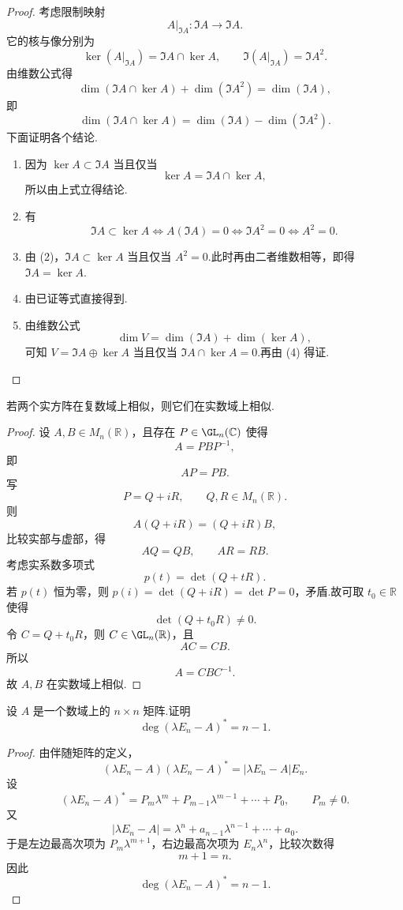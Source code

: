 \begin{proof}
	考虑限制映射
	\[
	A|_{\Im A}:\Im A\longrightarrow \Im A.
	\]
	它的核与像分别为
	\[
	\ker(A|_{\Im A})=\Im A\cap\ker A,
	\qquad
	\Im(A|_{\Im A})=\Im A^2.
	\]
	由维数公式得
	\[
	\dim(\Im A\cap\ker A)+\dim(\Im A^2)=\dim(\Im A),
	\]
	即
	\[
	\dim(\Im A\cap\ker A)=\dim(\Im A)-\dim(\Im A^2).
	\]
	下面证明各个结论.
	\begin{enumerate}
		\item 因为 $\ker A\subset \Im A$ 当且仅当
		\[
		\ker A=\Im A\cap\ker A,
		\]
		所以由上式立得结论.
		\item 有
		\[
		\Im A\subset \ker A
		\Longleftrightarrow
		A(\Im A)=0
		\Longleftrightarrow
		\Im A^2=0
		\Longleftrightarrow A^2=0.
		\]
		\item 由 (2)，$\Im A\subset\ker A$ 当且仅当 $A^2=0$.此时再由二者维数相等，即得
		$\Im A=\ker A$.
		\item 由已证等式直接得到.
		\item 由维数公式
		\[
		\dim V=\dim(\Im A)+\dim(\ker A),
		\]
		可知 $V=\Im A\oplus\ker A$ 当且仅当
		$\Im A\cap\ker A=0$.再由 (4) 得证.
	\end{enumerate}
\end{proof}

\begin{problem}[12]
	若两个实方阵在复数域上相似，则它们在实数域上相似.
\end{problem}

\begin{proof}
	设 $A,B\in M_n(\mathbb{R})$，且存在 $P\in \GL_n(\mathbb{C})$ 使得
	\[
	A=PBP^{-1},
	\]
	即
	\[
	AP=PB.
	\]
	写
	\[
	P=Q+iR,
	\qquad Q,R\in M_n(\mathbb{R}).
	\]
	则
	\[
	A(Q+iR)=(Q+iR)B,
	\]
	比较实部与虚部，得
	\[
	AQ=QB,
	\qquad
	AR=RB.
	\]
	考虑实系数多项式
	\[
	p(t)=\det(Q+tR).
	\]
	若 $p(t)$ 恒为零，则 $p(i)=\det(Q+iR)=\det P=0$，矛盾.故可取 $t_0\in\mathbb{R}$ 使得
	\[
	\det(Q+t_0R)\neq0.
	\]
	令 $C=Q+t_0R$，则 $C\in \GL_n(\mathbb{R})$，且
	\[
	AC=CB.
	\]
	所以
	\[
	A=CBC^{-1}.
	\]
	故 $A,B$ 在实数域上相似.
\end{proof}

\begin{problem}[15]
	设 $A$ 是一个数域上的 $n\times n$ 矩阵.证明
	\[
	\deg(\lambda E_n-A)^*=n-1.
	\]
\end{problem}

\begin{proof}
	由伴随矩阵的定义，
	\[
	(\lambda E_n-A)(\lambda E_n-A)^*=|\lambda E_n-A|E_n.
	\]
	设
	\[
	(\lambda E_n-A)^*=P_m\lambda^m+P_{m-1}\lambda^{m-1}+\cdots+P_0,
	\qquad P_m\neq0.
	\]
	又
	\[
	|\lambda E_n-A|=\lambda^n+a_{n-1}\lambda^{n-1}+\cdots+a_0.
	\]
	于是左边最高次项为 $P_m\lambda^{m+1}$，右边最高次项为 $E_n\lambda^n$，比较次数得
	\[
	m+1=n.
	\]
	因此
	\[
	\deg(\lambda E_n-A)^*=n-1.
	\]
\end{proof}

